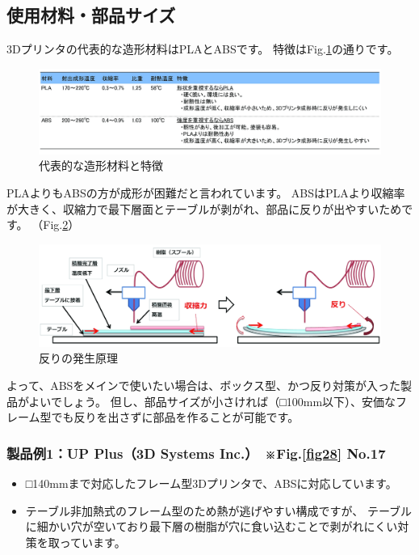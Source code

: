\subsection{使用材料・部品サイズ}\label{ux4f7fux7528ux6750ux6599ux90e8ux54c1ux30b5ux30a4ux30ba}

3Dプリンタの代表的な造形材料はPLAとABSです。
特徴はFig.\ref{fig31}の通りです。

\begin{figure}[htbp]
\centering
\includegraphics[width=360pt]{fig/fig31_cmyk.jpg}
\caption{代表的な造形材料と特徴}
\label{fig31}
\end{figure}

PLAよりもABSの方が成形が困難だと言われています。
ABSはPLAより収縮率が大きく、収縮力で最下層面とテーブルが剥がれ、部品に反りが出やすいためです。
（Fig.\ref{fig32}）

\begin{figure}[htbp]
\centering
\includegraphics[width=380pt]{fig/fig32_cmyk.jpg}
\caption{反りの発生原理}
\label{fig32}
\end{figure}

よって、ABSをメインで使いたい場合は、ボックス型、かつ反り対策が入った製品がよいでしょう。
但し、部品サイズが小さければ（□100mm以下）、安価なフレーム型でも反りを出さずに部品を作ることが可能です。

\subsubsection{\texorpdfstring{製品例1：UP Plus（3D Systems
Inc.）　※Fig.\ref{fig28}
No.17}{製品例1：UP Plus（3D Systems Inc.）　※Fig. No.17}}\label{ux88fdux54c1ux4f8b1up-plus3d-systems-inc.fig.-no.17}

\begin{itemize}
\tightlist
\item
  □140mmまで対応したフレーム型3Dプリンタで、ABSに対応しています。
\item
  テーブル非加熱式のフレーム型のため熱が逃げやすい構成ですが、
  テーブルに細かい穴が空いており最下層の樹脂が穴に食い込むことで剥がれにくい対策を取っています。
\end{itemize}

